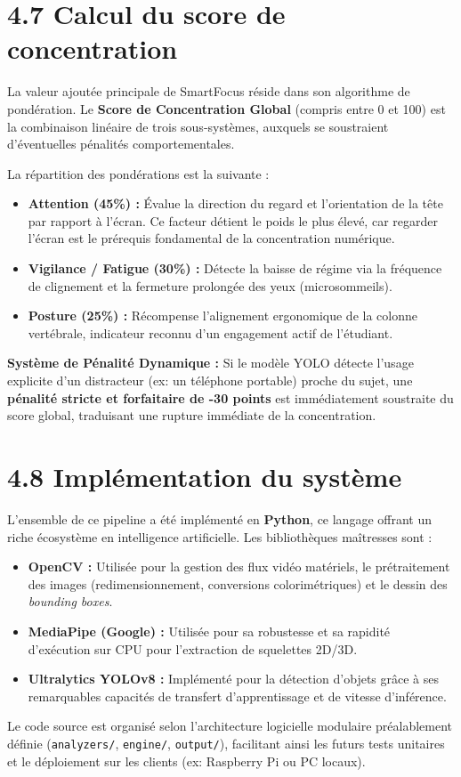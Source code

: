 \section{4.7 Calcul du score de concentration}
La valeur ajoutée principale de SmartFocus réside dans son algorithme de pondération. Le \textbf{Score de Concentration Global} (compris entre 0 et 100) est la combinaison linéaire de trois sous-systèmes, auxquels se soustraient d'éventuelles pénalités comportementales.

La répartition des pondérations est la suivante :
\begin{itemize}
    \item \textbf{Attention (45\%) :} Évalue la direction du regard et l'orientation de la tête par rapport à l'écran. Ce facteur détient le poids le plus élevé, car regarder l'écran est le prérequis fondamental de la concentration numérique.
    \item \textbf{Vigilance / Fatigue (30\%) :} Détecte la baisse de régime via la fréquence de clignement et la fermeture prolongée des yeux (microsommeils).
    \item \textbf{Posture (25\%) :} Récompense l'alignement ergonomique de la colonne vertébrale, indicateur reconnu d'un engagement actif de l'étudiant.
\end{itemize}

\textbf{Système de Pénalité Dynamique :}
Si le modèle YOLO détecte l'usage explicite d'un distracteur (ex: un téléphone portable) proche du sujet, une \textbf{pénalité stricte et forfaitaire de -30 points} est immédiatement soustraite du score global, traduisant une rupture immédiate de la concentration.


\section{4.8 Implémentation du système}
L'ensemble de ce pipeline a été implémenté en \textbf{Python}, ce langage offrant un riche écosystème en intelligence artificielle. Les bibliothèques maîtresses sont :
\begin{itemize}
    \item \textbf{OpenCV :} Utilisée pour la gestion des flux vidéo matériels, le prétraitement des images (redimensionnement, conversions colorimétriques) et le dessin des \textit{bounding boxes}.
    \item \textbf{MediaPipe (Google) :} Utilisée pour sa robustesse et sa rapidité d'exécution sur CPU pour l'extraction de squelettes 2D/3D.
    \item \textbf{Ultralytics YOLOv8 :} Implémenté pour la détection d'objets grâce à ses remarquables capacités de transfert d'apprentissage et de vitesse d'inférence.
\end{itemize}
Le code source est organisé selon l'architecture logicielle modulaire préalablement définie (\texttt{analyzers/}, \texttt{engine/}, \texttt{output/}), facilitant ainsi les futurs tests unitaires et le déploiement sur les clients (ex: Raspberry Pi ou PC locaux).

